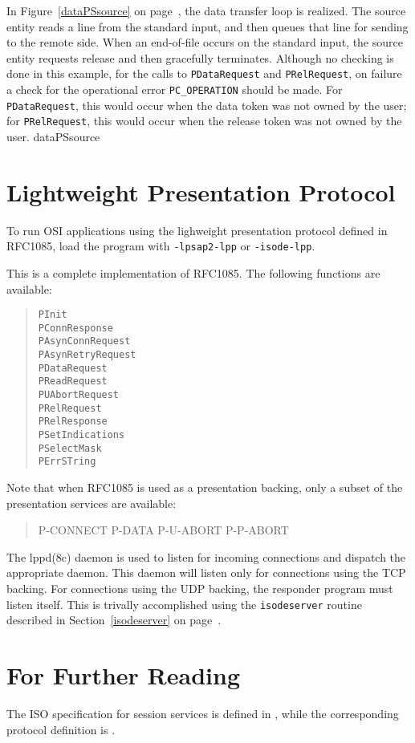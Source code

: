 In Figure~\ref{dataPSsource} on page~\pageref{dataPSsource},
the data transfer loop is realized.
The source entity reads a line from the standard input,
and then queues that line for sending to the remote side.
When an end-of-file occurs on the standard input,
the source entity requests release and then gracefully terminates.
Although no checking is done in this example,
for the calls to \verb"PDataRequest" and \verb"PRelRequest",
on failure
a check for the operational error \verb"PC_OPERATION" should be made.
For \verb"PDataRequest",
this would occur when the data token was not owned by the user;
for \verb"PRelRequest",
this would occur when the release token was not owned by the user.
\clearpage
{}
\clearpage
{}\empty
\clearpage
{}%
	{dataPSsource}

\section	{Lightweight Presentation Protocol}
To run OSI applications using the lighweight presentation protocol
defined in RFC1085,
load the program with \verb"-lpsap2-lpp" or \verb"-isode-lpp".

This is a complete implementation of RFC1085.
The following functions are available:
\begin{quote}\small\begin{verbatim}
PInit
PConnResponse
PAsynConnRequest
PAsynRetryRequest
PDataRequest
PReadRequest
PUAbortRequest
PRelRequest
PRelResponse
PSetIndications
PSelectMask
PErrSTring
\end{verbatim}\end{quote}
Note that when RFC1085 is used as a presentation backing,
only a subset of the presentation services are available:
\begin{quote}\small\sf
P-CONNECT
P-DATA
P-U-ABORT
P-P-ABORT
\end{quote}
The \man lppd(8c) daemon is used to listen for incoming connections and
dispatch the appropriate daemon.
This daemon will listen only for connections using the TCP backing.
For connections using the UDP backing,
the responder program must listen itself.
This is trivally accomplished using the \verb"isodeserver" routine
described in Section~\ref{isodeserver} on page~\pageref{isodeserver}.

\section	{For Further Reading}
The ISO specification for session services is defined in
\cite{ISO.PP.Service},
while the corresponding protocol definition is \cite{ISO.PP.Protocol}.


